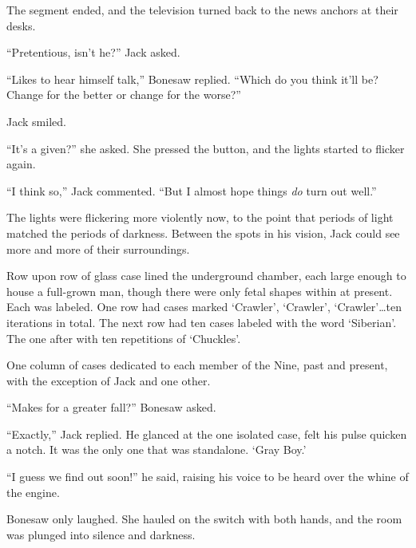 The segment ended, and the television turned back to the news anchors at their desks.



``Pretentious, isn't he?'' Jack asked.



``Likes to hear himself talk,'' Bonesaw replied.  ``Which do you think it'll be?  Change for the better or change for the worse?''



Jack smiled.



``It's a given?'' she asked.  She pressed the button, and the lights started to flicker again.



``I think so,'' Jack commented.  ``But I almost hope things \emph{do} turn out well.''



The lights were flickering more violently now, to the point that periods of light matched the periods of darkness.  Between the spots in his vision, Jack could see more and more of their surroundings.



Row upon row of glass case lined the underground chamber, each large enough to house a full-grown man, though there were only fetal shapes within at present.  Each was labeled.  One row had cases marked `Crawler', `Crawler', `Crawler'\ldots ten iterations in total.  The next row had ten cases labeled with the word `Siberian'.  The one after with ten repetitions of `Chuckles'.



One column of cases dedicated to each member of the Nine, past and present, with the exception of Jack and one other.



``Makes for a greater fall?'' Bonesaw asked.



``Exactly,'' Jack replied.  He glanced at the one isolated case, felt his pulse quicken a notch.  It was the only one that was standalone.  `Gray Boy.'



``I guess we find out soon!'' he said, raising his voice to be heard over the whine of the engine.



Bonesaw only laughed.  She hauled on the switch with both hands, and the room was plunged into silence and darkness.






